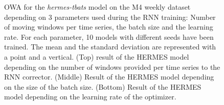 \documentclass[lettersize,journal]{IEEEtran}
\begin{document}
\begin{figure}
\caption{OWA for the \textit{hermes-tbats} model on the M4 weekly dataset depending on 3 parameters used during the RNN training: Number of moving windows per time series, the batch size and the learning rate. For each parameter, 10 models with different seeds have been trained. The mean and the standard deviation are represented with a point and a vertical. (Top) result of the HERMES model depending on the number of windows provided per time series to the RNN corrector. (Middle) Result of the HERMES model depending on the size of the batch size. (Bottom) Result of the HERMES model depending on the learning rate of the optimizer.}
\label{fig:m4parameter}
\end{figure}


%
%


\newpage






%
%
%
\end{document}
